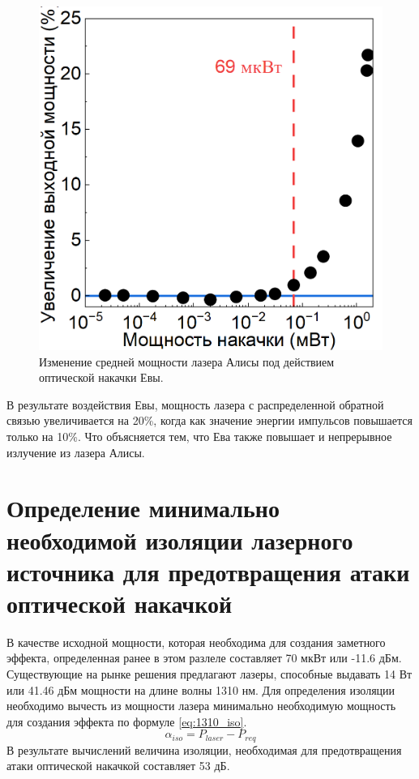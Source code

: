 \begin{figure}
    \centering
    \includegraphics{images/1310_мощность.png}
    \caption{Изменение средней мощности лазера Алисы под действием оптической накачки Евы.}
    \label{fig:avg pwr 1310 ch4}
\end{figure}
В результате воздействия Евы, мощность лазера с распределенной обратной связью увеличивается на 20\%, когда как значение энергии импульсов повышается только на 10\%. Что объясняется тем, что Ева также повышает и непрерывное излучение из лазера Алисы.
\section{Определение минимально необходимой изоляции лазерного источника для предотвращения атаки оптической накачкой}\label{sec:ch4/sect5}
В качестве исходной мощности, которая необходима для создания заметного эффекта, определенная ранее в этом разлеле составляет 70 мкВт или -11.6 дБм. Существующие на рынке решения предлагают лазеры, способные выдавать 14 Вт или 41.46 дБм мощности на длине волны 1310 нм. 
Для определения изоляции необходимо вычесть из мощности лазера минимально необходимую мощность для создания эффекта по формуле \ref{eq:1310_iso}.
\begin{equation}
\label{eq:1310_iso}
    \alpha_{iso} = P_{laser} - P_{req}
\end{equation}
В результате вычислений величина изоляции, необходимая для предотвращения атаки оптической накачкой составляет 53 дБ. 

